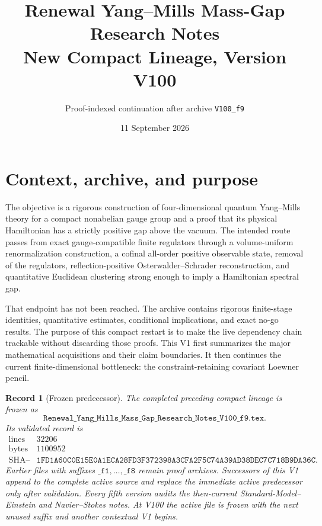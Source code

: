 \documentclass[11pt,oneside]{article}
\title{Renewal Yang--Mills Mass-Gap Research Notes\\
New Compact Lineage, Version V100}
\author{Proof-indexed continuation after archive \texttt{V100\_f9}}
\date{11 September 2026}
\newtheorem{record}[theorem]{Record}
\theoremstyle{definition}
\theoremstyle{remark}
\begin{document}
\maketitle
\tableofcontents

\section{Context, archive, and purpose}
\label{sec:newv1-context}

The objective is a rigorous construction of four-dimensional
quantum Yang--Mills theory for a compact nonabelian gauge group and
a proof that its physical Hamiltonian has a strictly positive gap
above the vacuum.  The intended route passes from exact
gauge-compatible finite regulators through a volume-uniform
renormalization construction, a cofinal all-order positive
observable state, removal of the regulators, reflection-positive
Osterwalder--Schrader reconstruction, and quantitative Euclidean
clustering strong enough to imply a Hamiltonian spectral gap.

That endpoint has not been reached.  The archive contains rigorous
finite-stage identities, quantitative estimates, conditional
implications, and exact no-go results.  The purpose of this compact
restart is to make the live dependency chain trackable without
discarding those proofs.  This V1 first summarizes the major
mathematical acquisitions and their claim boundaries.  It then
continues the current finite-dimensional bottleneck: the
constraint-retaining covariant Loewner pencil.

\begin{record}[Frozen predecessor]
\label{rec:newv1-archive}
The completed preceding compact lineage is frozen as
\[
\texttt{Renewal\_Yang\_Mills\_Mass\_Gap\_Research\_Notes\_V100\_f9.tex}.
\]
Its validated record is
\[
\begin{array}{c|c}
\text{lines}&32206\\
\text{bytes}&1100952\\
\text{SHA--256}&
\texttt{1FD1A60C0E15E0A1ECA28FD3F372398A3CFA2F5C74A39AD38DEC7C718B9DA36C}.
\end{array}                                                   \tag{1.1}
\]
Earlier files with suffixes \(\texttt{\_f1},\ldots,\texttt{\_f8}\)
remain proof archives.  Successors of this V1 append to the complete
active source and replace the immediate active predecessor only
after validation.  Every fifth version audits the then-current
Standard-Model--Einstein and Navier--Stokes notes.  At V100 the
active file is frozen with the next unused suffix and another
contextual V1 begins.
\end{record}
\end{document}
